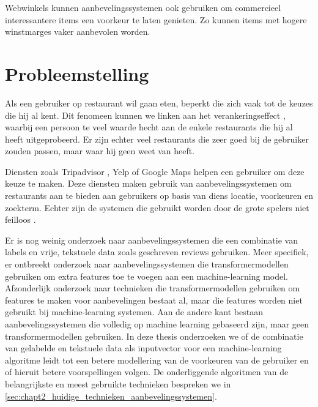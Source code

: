 Webwinkels kunnen aanbevelingssystemen ook gebruiken om commercieel interessantere items een voorkeur te laten genieten. Zo kunnen items met hogere winstmarges vaker aanbevolen worden.


\section{Probleemstelling}
Als een gebruiker op restaurant wil gaan eten, beperkt die zich vaak tot de keuzes die hij al kent. Dit fenomeen kunnen we linken aan het verankeringseffect \cite{anchoring_effect}, waarbij een persoon te veel waarde hecht aan de enkele restaurants die hij al heeft uitgeprobeerd. Er zijn echter veel restaurants die zeer goed bij de gebruiker zouden passen, maar waar hij geen weet van heeft.

Diensten zoals Tripadvisor \cite{tripadvisor_algorithm}, Yelp of Google Maps helpen een gebruiker om deze keuze te maken. Deze diensten maken gebruik van aanbevelingssystemen om restaurants aan te bieden aan gebruikers op basis van diens locatie, voorkeuren en zoekterm. Echter zijn de systemen die gebruikt worden door de grote spelers niet feilloos \cite{recsys_bad, recsys_youtube_bad}. 

Er is nog weinig onderzoek naar aanbevelingssystemen die een combinatie van labels en vrije, tekstuele data zoals geschreven reviews gebruiken. Meer specifiek, er ontbreekt onderzoek naar aanbevelingssystemen die transformermodellen gebruiken om extra features toe te voegen aan een machine-learning model.
Afzonderlijk onderzoek naar technieken die transformermodellen gebruiken om features te maken voor aanbevelingen bestaat al, maar die features worden niet gebruikt bij machine-learning systemen. \cite{masterthesis_nlp_italie} Aan de andere kant bestaan aanbevelingssystemen die volledig op machine learning gebaseerd zijn, maar geen transformermodellen gebruiken. \cite{deepconn} In deze thesis onderzoeken we of de combinatie van gelabelde en tekstuele data als inputvector voor een machine-learning algoritme leidt tot een betere modellering van de voorkeuren van de gebruiker en of hieruit betere voorspellingen volgen. De onderliggende algoritmen van de belangrijkste en meest gebruikte technieken bespreken we in \autoref{sec:chapt2_huidige_technieken_aanbevelingssystemen}. 



